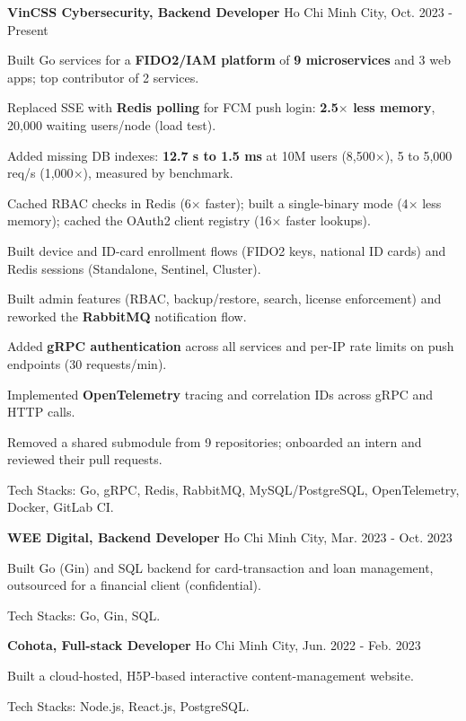 \begin{cventries} %
  \cvsimpleentry
    {\textbf{VinCSS Cybersecurity, Backend Developer}} %
    {Ho Chi Minh City, Oct. 2023 - Present} %
    {
      \begin{cvitems} %
        \item {Built Go services for a \textbf{FIDO2/IAM platform} of \textbf{9 microservices} and 3 web apps; top contributor of 2 services.}
        \item {Replaced SSE with \textbf{Redis polling} for FCM push login: \textbf{2.5$\times$ less memory}, 20,000 waiting users/node (load test).}
        \item {Added missing DB indexes: \textbf{12.7 s to 1.5 ms} at 10M users (8,500$\times$), 5 to 5,000 req/s (1,000$\times$), measured by benchmark.}
        \item {Cached RBAC checks in Redis (6$\times$ faster); built a single-binary mode (4$\times$ less memory); cached the OAuth2 client registry (16$\times$ faster lookups).}
        \item {Built device and ID-card enrollment flows (FIDO2 keys, national ID cards) and Redis sessions (Standalone, Sentinel, Cluster).}
        \item {Built admin features (RBAC, backup/restore, search, license enforcement) and reworked the \textbf{RabbitMQ} notification flow.}
        \item {Added \textbf{gRPC authentication} across all services and per-IP rate limits on push endpoints (30 requests/min).}
        \item {Implemented \textbf{OpenTelemetry} tracing and correlation IDs across gRPC and HTTP calls.}
        \item {Removed a shared submodule from 9 repositories; onboarded an intern and reviewed their pull requests.}
        \item {Tech Stacks: Go, gRPC, Redis, RabbitMQ, MySQL/PostgreSQL, OpenTelemetry, Docker, GitLab CI.}
      \end{cvitems}
    }

  \cvsimpleentry
    {\textbf{WEE Digital, Backend Developer}} %
    {Ho Chi Minh City, Mar. 2023 - Oct. 2023} %
    {
      \begin{cvitems} %
        \item {Built Go (Gin) and SQL backend for card-transaction and loan management, outsourced for a financial client (confidential).}
        \item {Tech Stacks: Go, Gin, SQL.}
      \end{cvitems}
    }

  \cvsimpleentry
    {\textbf{Cohota, Full-stack Developer}} %
    {Ho Chi Minh City, Jun. 2022 - Feb. 2023} %
    {
      \begin{cvitems} %
        \item {Built a cloud-hosted, H5P-based interactive content-management website.}
        \item {Tech Stacks: Node.js, React.js, PostgreSQL.}
      \end{cvitems}
    }
\end{cventries}
